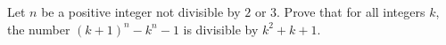 Let $n$ be a positive integer not divisible by $2$ or $3$. Prove that for all integers $k$,  the number $(k+1)^n-k^n-1$ is divisible by $k^2+k+1$.